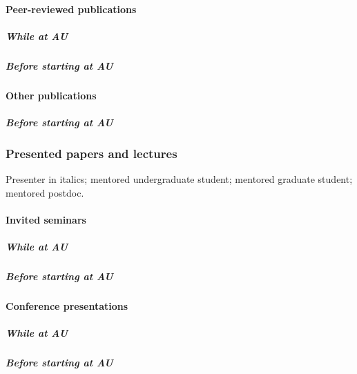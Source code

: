 \paragraph{Peer-reviewed publications}

\subparagraph*{While at AU}
\nocite{*}
\printbibliography[filter=cvpapersnopreprints, check=afteraustart, heading=none]

\subparagraph*{Before starting at AU}
\nocite{*}
\printbibliography[filter=cvpapersnopreprints, check=beforeaustart, heading=none]

\paragraph{Other publications}
\subparagraph*{Before starting at AU}


\subsubsection{Presented papers and lectures}
Presenter in italics;
\ugsymbol{}mentored undergraduate student;
\phdsymbol{}mentored graduate student;
\postdocsymbol{}mentored postdoc.

\paragraph{Invited seminars}
\subparagraph*{While at AU}
\nocite{*}
\printbibliography[filter=auinvitedpresentation, heading=none]

\subparagraph*{Before starting at AU}
\nocite{*}
\printbibliography[filter=beforeauinvitedpresentation, heading=none]

\paragraph{Conference presentations}
\subparagraph*{While at AU}
\nocite{*}
\printbibliography[filter=aupresentation, heading=none]

\subparagraph{Before starting at AU}
\nocite{*}
\printbibliography[filter=beforeaupresentation, heading=none]




